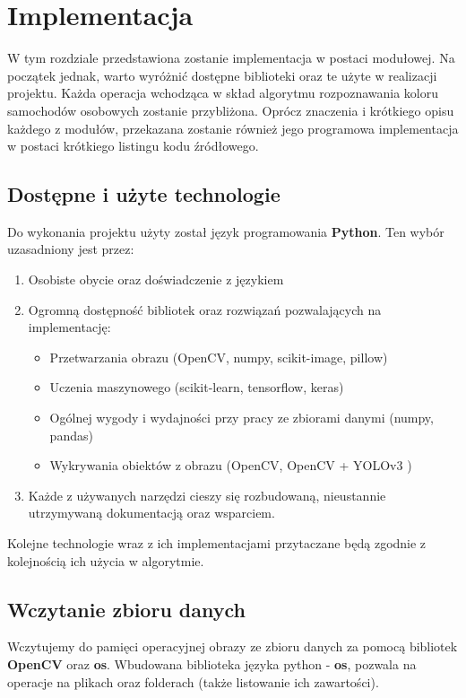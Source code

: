 \section{Implementacja}
W tym rozdziale przedstawiona zostanie implementacja w postaci modułowej. Na początek jednak, warto wyróżnić dostępne biblioteki oraz te użyte w realizacji projektu. Każda operacja wchodząca w skład algorytmu rozpoznawania koloru samochodów osobowych zostanie przybliżona. Oprócz znaczenia i krótkiego opisu każdego z modułów, przekazana zostanie również jego programowa implementacja w postaci krótkiego listingu kodu źródłowego.

\subsection{Dostępne i użyte technologie}

Do wykonania projektu użyty został język programowania \textbf{Python}. Ten wybór uzasadniony jest przez:
\begin{enumerate}
    \item Osobiste obycie oraz doświadczenie z językiem 
    \item Ogromną dostępność bibliotek oraz rozwiązań pozwalających na implementację:
        \begin{itemize}
            \item Przetwarzania obrazu (OpenCV, numpy, scikit-image, pillow)
            \item Uczenia maszynowego (scikit-learn, tensorflow, keras)
            \item Ogólnej wygody i wydajności przy pracy ze zbiorami danymi (numpy, pandas)
            \item Wykrywania obiektów z obrazu (OpenCV, OpenCV + YOLOv3 \cite{yolov3})
        \end{itemize}
    \item Każde z używanych narzędzi cieszy się rozbudowaną, nieustannie utrzymywaną dokumentacją oraz wsparciem.
\end{enumerate}

Kolejne technologie wraz z ich implementacjami przytaczane będą zgodnie z kolejnością ich użycia w algorytmie.

\subsection{Wczytanie zbioru danych}
Wczytujemy do pamięci operacyjnej obrazy ze zbioru danych za pomocą bibliotek \textbf{OpenCV} oraz \textbf{os}.
Wbudowana biblioteka języka python - \textbf{os}, pozwala na operacje na plikach oraz folderach (także listowanie ich zawartości).

